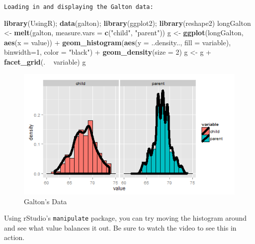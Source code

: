 \documentclass[]{article}
\newenvironment{Shaded}{\begin{snugshade}}{\end{snugshade}}
\newcommand{\KeywordTok}[1]{\textcolor[rgb]{0.13,0.29,0.53}{\textbf{{#1}}}}
\newcommand{\DataTypeTok}[1]{\textcolor[rgb]{0.13,0.29,0.53}{{#1}}}
\newcommand{\DecValTok}[1]{\textcolor[rgb]{0.00,0.00,0.81}{{#1}}}
\newcommand{\StringTok}[1]{\textcolor[rgb]{0.31,0.60,0.02}{{#1}}}
\newcommand{\NormalTok}[1]{{#1}}
\begin{document}
\vspace{1pc}

\verb;Loading in and displaying the Galton data:;

\begin{Shaded}
\begin{Highlighting}[]
\KeywordTok{library}\NormalTok{(UsingR); }\KeywordTok{data}\NormalTok{(galton); }\KeywordTok{library}\NormalTok{(ggplot2); }\KeywordTok{library}\NormalTok{(reshape2)}
\NormalTok{longGalton <-}\StringTok{ }\KeywordTok{melt}\NormalTok{(galton, }\DataTypeTok{measure.vars =} \KeywordTok{c}\NormalTok{(}\StringTok{"child"}\NormalTok{, }\StringTok{"parent"}\NormalTok{))}
\NormalTok{g <-}\StringTok{ }\KeywordTok{ggplot}\NormalTok{(longGalton, }\KeywordTok{aes}\NormalTok{(}\DataTypeTok{x =} \NormalTok{value)) +}
\StringTok{  }\KeywordTok{geom_histogram}\NormalTok{(}\KeywordTok{aes}\NormalTok{(}\DataTypeTok{y =} \NormalTok{..density..,  }\DataTypeTok{fill =} \NormalTok{variable),}
                 \DataTypeTok{binwidth=}\DecValTok{1}\NormalTok{, }\DataTypeTok{color =} \StringTok{"black"}\NormalTok{) +}
\StringTok{  }\KeywordTok{geom_density}\NormalTok{(}\DataTypeTok{size =} \DecValTok{2}\NormalTok{)}
\NormalTok{g <-}\StringTok{ }\NormalTok{g +}\StringTok{ }\KeywordTok{facet_grid}\NormalTok{(. ~}\StringTok{ }\NormalTok{variable)}
\NormalTok{g}
\end{Highlighting}
\end{Shaded}

\begin{figure}[htbp]
\centering
\includegraphics{LeanPub/images/galton-1.png}
\caption{Galton's Data}
\end{figure}

Using rStudio's \texttt{manipulate} package, you can try moving the
histogram around and see what value balances it out. Be sure to watch
the video to see this in action.
\end{document}
